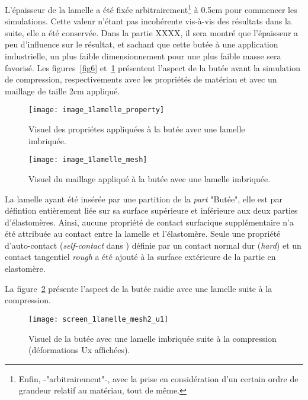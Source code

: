 ﻿ \documentclass{article}
\newcommand{\abaqus}{\bsc{Abaqus}\xspace}
\begin{document}
L'épaisseur de la lamelle a été fixée arbitrairement\footnote{Enfin, -"arbitrairement"-, avec la prise en considération d'un certain ordre de grandeur relatif au matériau, tout de même.} à 0.5cm pour commencer les simulations. Cette valeur n'étant pas incohérente vis-à-vis des résultats dans la suite, elle a été conservée. Dans la partie XXXX, il sera montré que l'épaisseur a peu d'influence sur le résultat, et sachant que cette butée à une application industrielle, un plus faible dimensionnement pour une plus faible masse sera favorisé. 
Les figures~\ref{fig6} et~\ref{fig7} présentent l'aspect de la butée avant la simulation de compression, respectivements avec les propriétés de matériau et avec un maillage de taille 2cm appliqué.

\begin{figure}[htbp]
	\begin{minipage}[c]{.45\linewidth}
	\begin{center}
	\texttt{[image: image\_1lamelle\_property]}
	\caption{Visuel des propriétes appliquées à la butée avec une lamelle imbriquée.}
	\label{fig6}
	\end{center}
	\end{minipage}
	\hfill
	\begin{minipage}[c]{.45\linewidth}
	\begin{center}
	\texttt{[image: image\_1lamelle\_mesh]}
	\caption{Visuel du maillage appliqué à la butée avec une lamelle imbriquée.}
	\label{fig7}
	\end{center}
	\end{minipage}
\end{figure}

La lamelle ayant été insérée par une partition de la \textit{part} "Butée", elle est par défintion entièrement liée sur sa surface supérieure et inférieure aux deux parties d'élastomères. Ainsi, aucune propriété de contact surfacique supplémentaire n'a été attribuée au contact entre la lamelle et l'élastomère. Seule une propriété d'auto-contact (\textit{self-contact} dans \abaqus) définie par un contact normal dur (\textit{hard}) et un contact tangentiel \textit{rough} a été ajouté à la surface extérieure de la partie en elastomère. 

La figure~\ref{fig8} présente l'aspect de la butée raidie avec une lamelle suite à la compression.

\begin{figure}[!h]
	\centering
	\texttt{[image: screen\_1lamelle\_mesh2\_u1]}
	\caption{Visuel de la butée avec une lamelle imbriquée suite à la compression (déformations Ux affichées).}
	\label{fig8}
\end{figure}
\end{document}
